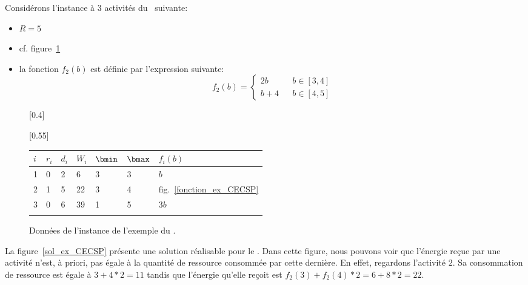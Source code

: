 \begin{ex}
Considérons l'instance à $3$ activités du \CECSP~suivante:
\begin{itemize}
\item $R=5$
\item cf. figure~\ref{ex_CECSP}
\item la fonction $f_2(b)$ est définie par l'expression suivante: 
\[f_2(b)=\left\{
\begin{array}{lll}
2b & & b \in [3,4]\\
b+4 & & b \in [4,5]
\end{array}
\right.\]
\end{itemize}
\begin{figure}[!htb]
\centering
{}[0.4\linewidth]{
}
\hfill
{}[0.55\linewidth]{
  \begin{tabular}{|M{0.6cm}|M{0.6cm}M{0.6cm}M{0.6cm}M{0.6cm}M{0.6cm}M{1.2cm}|}
    \hline
    $i$ & $r_i$ & $d_i$ & $W_i$ & $\bmin$ & $\bmax$ & $f_i(b)$\\[2mm]
 & 0 & 2 & 6 & 3 & 3 & $b$\\[2mm]
    2 & 1 & 5 & 22 & 3 & 4 & fig.~\ref{fonction_ex_CECSP}\\[2mm]
    3 & 0 & 6 & 39 & 1 & 5 & $3b$\\[2mm]
    \hline
  \end{tabular}} 
\caption{Données de l'instance de l'exemple du \CECSP.}
\label{ex_CECSP}
\end{figure}
La figure~\ref{sol_ex_CECSP} présente une solution réalisable pour le
\CECSP. Dans cette figure, nous pouvons voir que l'énergie reçue par une
activité n'est, à priori, pas égale à la quantité de ressource
consommée par cette dernière. En effet, regardons l'activité $2$. Sa
consommation de ressource est égale à $3 + 4 * 2 = 11$ tandis que
l'énergie qu'elle reçoit est $f_2(3)+ f_2(4) * 2 = 6 + 8 * 2 =22$.


\end{ex}
